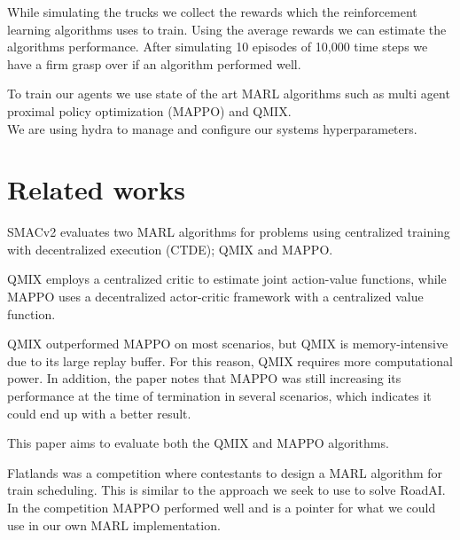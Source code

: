 \documentclass[conference]{IEEEtran}
\begin{document}
While simulating the trucks we collect the rewards which the reinforcement learning algorithms uses to train.
Using the average rewards we can estimate the algorithms performance. After simulating 10 episodes of 10,000 time steps we have a firm grasp over if an algorithm performed well.

To train our agents we use state of the art MARL algorithms such as multi agent proximal policy  optimization (MAPPO) and QMIX.
\\
We are using hydra\cite{Yadan2019Hydra} to manage and configure our systems hyperparameters.


\section{Related works}
SMACv2\cite{ellis2022smacv2} evaluates two MARL algorithms for problems using centralized training with
decentralized execution (CTDE); QMIX and MAPPO.

QMIX employs a centralized critic to estimate joint action-value functions, while MAPPO uses a decentralized
actor-critic framework with a centralized value function.

QMIX outperformed MAPPO on most scenarios, but QMIX is memory-intensive due to its large replay buffer. For
this reason, QMIX requires more computational power. In addition, the paper notes that MAPPO was still
increasing its performance at the time of termination in several scenarios, which indicates it could end up
with a better result.

This paper aims to evaluate both the QMIX and MAPPO algorithms.


Flatlands\cite{laurent2021flatland} was a competition where contestants to design a MARL algorithm for 
train scheduling. This is similar to the approach we seek to use to solve RoadAI. 
In the competition MAPPO performed well and is a pointer for what we could use in our own MARL implementation.

\noindent




\newpage


\end{document}
